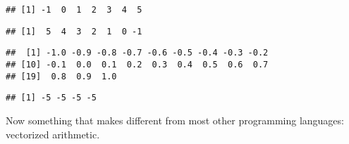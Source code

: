 \documentclass[paper=a4,headsepline,BCOR=12mm,twoside,open=right,%
titlepage,headings=small,fontsize=10pt,index=totoc,bibliography=totoc,%
captions=tableheading,captions=nooneline]{scrbook}\usepackage{knitr}
\begin{document}
\begin{knitrout}\footnotesize
{}\color{fgcolor}\begin{kframe}
\begin{alltt}
 \hlkwb{<-} \hlopt{-}\hlopt{:}
\end{alltt}
\begin{verbatim}
## [1] -1  0  1  2  3  4  5
\end{verbatim}
\begin{alltt}
 \hlkwb{<-} \hlopt{:-}
\end{alltt}
\begin{verbatim}
## [1]  5  4  3  2  1  0 -1
\end{verbatim}
\begin{alltt}
 \hlkwb{<-} \hlstd{(} \hlstd{=} \hlopt{-}\hlstd{,}  \hlstd{=} \hlstd{,}  \hlstd{=} \hlstd{)}
\end{alltt}
\begin{verbatim}
##  [1] -1.0 -0.9 -0.8 -0.7 -0.6 -0.5 -0.4 -0.3 -0.2
## [10] -0.1  0.0  0.1  0.2  0.3  0.4  0.5  0.6  0.7
## [19]  0.8  0.9  1.0
\end{verbatim}
\begin{alltt}
 \hlkwb{<-} \hlstd{(}\hlopt{-}\hlstd{,} \hlstd{)}
\end{alltt}
\begin{verbatim}
## [1] -5 -5 -5 -5
\end{verbatim}
\end{kframe}
\end{knitrout}

Now something that makes \R different from most other programming languages: vectorized arithmetic.
\end{document}
